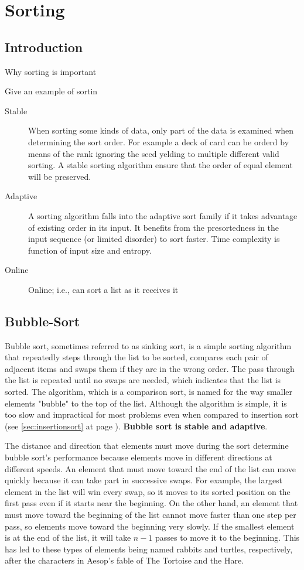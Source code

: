 \chapter{Sorting}

\section{Introduction}
Why sorting is important

Give an example of sortin
\begin{description}
\item[Stable] When sorting some kinds of data, only part of the data is examined when determining the sort order. For example a deck of card can be orderd by means of the rank ignoring the seed yelding to multiple different valid sorting. A stable sorting algorithm ensure that the order of equal element will be preserved. 
\item[Adaptive]	A sorting algorithm falls into the adaptive sort family if it takes advantage of existing order in its input.  It benefits from the presortedness in the input sequence (or limited disorder) to sort faster. Time complexity is function of input size and entropy.
\item [Online] Online; i.e., can sort a list as it receives it
\end{description}

\section{Bubble-Sort}
Bubble sort, sometimes referred to as sinking sort, is a simple sorting algorithm that repeatedly steps through the list to be sorted, compares each pair of adjacent items and swaps them if they are in the wrong order. The pass through the list is repeated until no swaps are needed, which indicates that the list is sorted. The algorithm, which is a comparison sort, is named for the way smaller elements "bubble" to the top of the list. Although the algorithm is simple, it is too slow and impractical for most problems even when compared to insertion sort (see \ref{sec:insertionsort} at page \pageref{sec:insertionsort}). \textbf{Bubble sort is stable and adaptive}.

The distance and direction that elements must move during the sort determine bubble sort's performance because elements move in different directions at different speeds. An element that must move toward the end of the list can move quickly because it can take part in successive swaps. For example, the largest element in the list will win every swap, so it moves to its sorted position on the first pass even if it starts near the beginning. On the other hand, an element that must move toward the beginning of the list cannot move faster than one step per pass, so elements move toward the beginning very slowly. If the smallest element is at the end of the list, it will take $n-1$ passes to move it to the beginning. This has led to these types of elements being named rabbits and turtles, respectively, after the characters in Aesop's fable of The Tortoise and the Hare.

